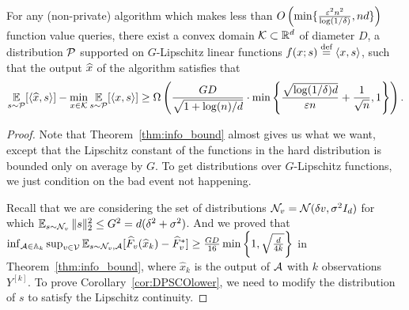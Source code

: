 \begin{corollary}
\label{cor:DPSCOlower}
For any (non-private) algorithm which makes less than $O\left(\min\{\frac{\varepsilon^2n^2}{\log(1/\delta)},nd\}\right)$ function value queries, there exist a convex domain $\mathcal K\subset \mathbb{R}^d$ of diameter $D$, a distribution $\mathcal P$ supported on $G$-Lipschitz linear functions $f(x;s)\stackrel{{\text{def}}}{=}\langle x,s\rangle$, such that the output $\widehat{x}$ of the algorithm satisfies that
\begin{align*}
    \operatorname*{\mathbb{E}}_{s\sim\mathcal P}[\langle \widehat{x},s\rangle]-\min_{x\in\mathcal K}\operatorname*{\mathbb{E}}_{s\sim\mathcal P}[\langle x,s\rangle]\geq \Omega\left( \frac{G D}{\sqrt{1+\log(n)/d}} \cdot \min\left\{\frac{\sqrt{\log(1/\delta)d}}{\varepsilon n}+\frac{1}{\sqrt{n}},1\right\} \right).
\end{align*}
\end{corollary}
\begin{proof}

Note that Theorem~\ref{thm:info_bound} almost gives us what we want, except that the Lipschitz constant of the functions in the hard distribution is bounded only on average by $G$. To get distributions over $G$-Lipschitz functions, we just condition on the bad event not happening.

Recall that we are considering the set of distributions $\mathcal N_v=\mathcal N(\delta v,\sigma^2 I_d)$ for which $\operatorname*{\mathbb{E}}_{s\sim\mathcal N_v}\|s\|_2^2\le G^2=d(\delta^2+\sigma^2)$.
And we proved that 
$\inf_{\mathcal A\in \mathbb{A}_k}\sup_{v\in \mathcal V}\operatorname*{\mathbb{E}}_{s\sim \mathcal N_v,\mathcal A}[\widehat{F}_v(\widehat{x}_k)-\widehat{F}_v^*]\ge \frac{GD}{16}\min\left\{1,\sqrt{\frac{d}{4k}}\right\}$ in Theorem~\ref{thm:info_bound}, where $\hat{x}_k$ is the output of $\mathcal A$ with $k$ observations $Y^{[k]}$.
To prove Corollary~\ref{cor:DPSCOlower}, we need to modify the distribution of $s$ to satisfy the Lipschitz continuity.


\end{proof}

